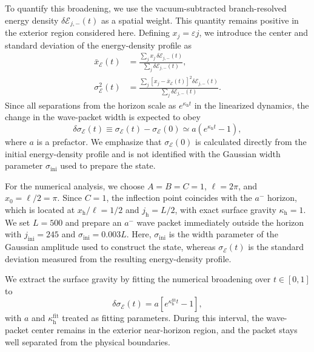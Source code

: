 \documentclass[reprint,amsmath,amssymb,aps,showkeys,superscriptaddress]{revtex4-2}
\begin{document}
To quantify this broadening, we use the vacuum-subtracted
branch-resolved energy density
$\delta\mathcal{E}_{j,-}(t)$ as a spatial weight. This quantity
remains positive in the exterior region considered here. Defining
$x_j=\varepsilon j$, we introduce the center and standard deviation
of the energy-density profile as
\begin{align}
  \bar{x}_{\mathcal E}(t)
  &=
  \frac{
    \displaystyle
    \sum_j
    x_j\,
    \delta\mathcal{E}_{j,-}(t)
  }{
    \displaystyle
    \sum_j
    \delta\mathcal{E}_{j,-}(t)
  },
  \label{eq:energy_center}
  \\
  \sigma_{\mathcal E}^2(t)
  &=
  \frac{
    \displaystyle
    \sum_j
    \left[
      x_j-\bar{x}_{\mathcal E}(t)
    \right]^2
    \delta\mathcal{E}_{j,-}(t)
  }{
    \displaystyle
    \sum_j
    \delta\mathcal{E}_{j,-}(t)
  }.
  \label{eq:energy_width}
\end{align}
Since all separations from the horizon scale as
$e^{\kappa_{\mathrm h}t}$ in the linearized dynamics, the change in
the wave-packet width is expected to obey
\begin{equation}
  \delta\sigma_{\mathcal E}(t)
  \equiv
  \sigma_{\mathcal E}(t)
  -
  \sigma_{\mathcal E}(0)
  \simeq
  a\left(
    e^{\kappa_{\mathrm h}t}-1
  \right),
  \label{eq:sigma_kappa}
\end{equation}
where $a$ is a prefactor. We emphasize that
$\sigma_{\mathcal E}(0)$ is calculated directly from the initial
energy-density profile and is not identified with the Gaussian
width parameter $\sigma_{\mathrm{ini}}$ used to prepare the state.

For the numerical analysis, we choose
$A=B=C=1$, $\ell=2\pi$, and $x_0=\ell/2=\pi$.
Since $C=1$, the inflection point coincides with the $a^-$ horizon,
which is located at
$x_{\mathrm h}/\ell=1/2$ and
$j_{\mathrm h}=L/2$, with exact surface gravity
$\kappa_{\mathrm h}=1$. We set $L=500$ and prepare an $a^-$ wave
packet immediately outside the horizon with
$j_{\mathrm{ini}}=245$ and
$\sigma_{\mathrm{ini}}=0.003L$.
Here, $\sigma_{\mathrm{ini}}$ is the width parameter of the
Gaussian amplitude used to construct the state, whereas
$\sigma_{\mathcal E}(t)$ is the standard deviation measured from
the resulting energy-density profile.

We extract the surface gravity by fitting the numerical broadening
over $t\in[0,1]$ to
\begin{equation}
  \delta\sigma_{\mathcal E}(t)
  =
  a\left[
    e^{\kappa_{\mathrm h}^{\mathrm{fit}}t}-1
  \right],
  \label{eq:surface_gravity_fit}
\end{equation}
with $a$ and $\kappa_{\mathrm h}^{\mathrm{fit}}$ treated as fitting
parameters. During this interval, the wave-packet center remains in
the exterior near-horizon region, and the packet stays well
separated from the physical boundaries.
\end{document}
